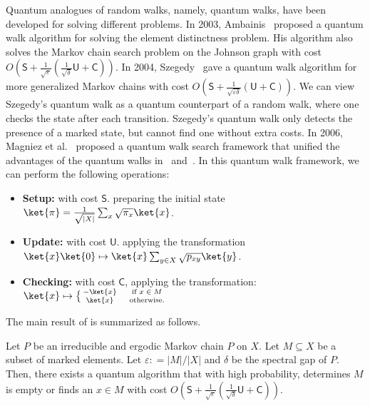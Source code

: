 Quantum analogues of random walks, namely, quantum walks, have been developed for solving different problems. In 2003, Ambainis~\cite{r5} proposed a quantum walk algorithm for solving the element distinctness problem. His algorithm also solves the Markov chain search problem on the Johnson graph with cost $O(\mathsf{S} + \frac{1}{\sqrt{\varepsilon}}(\frac{1}{\sqrt{\delta}}\mathsf{U} + \mathsf{C}))$. In 2004, Szegedy~\cite{r45} gave a quantum walk algorithm for more generalized Markov chains with cost $O(\mathsf{S} + \frac{1}{\sqrt{\varepsilon\delta}}(\mathsf{U} + \mathsf{C}))$. We can view Szegedy's quantum walk as a quantum counterpart of a random walk, where one checks the state after each transition. Szegedy's quantum walk only detects the presence of a marked state, but cannot find one without extra costs. In 2006, Magniez et al.~\cite{r33} proposed a quantum walk search framework that unified the advantages of the quantum walks in~\cite{r5} and~\cite{r45}. In this quantum walk framework, we can perform the following operations:
\begin{itemize}
  \item \textbf{Setup:} with cost $\mathsf{S}$. preparing the initial state $\ket{\pi} = \frac{1}{\sqrt{|X|}}\sum_{x}\sqrt{\pi_x}\ket{x}$.
  \item \textbf{Update:}  with cost $\mathsf{U}$. applying the transformation $\ket{x}\ket{0} \mapsto \ket{x}\sum_{y\in X}\sqrt{p_{xy}}\ket{y}$.
  \item \textbf{Checking:} with cost $\mathsf{C}$, applying the transformation: $\ket{x} \mapsto \big\{\begin{smallmatrix} -\ket{x} \quad &\text{if $x\in M$} \\ \ket{x} \quad &\text{otherwise.}\end{smallmatrix}$
\end{itemize}
The main result of \cite{r33} is summarized as follows.
\begin{lemma}[\cite{r33}]
  \label{lem:framework}
  Let $P$ be an irreducible and ergodic Markov chain $P$ on $X$. Let $M \subseteq X$ be a subset of marked elements. Let $\varepsilon: = |M|/|X|$ and $\delta$ be the spectral gap of $P$. Then, there exists a quantum algorithm that with high probability, determines $M$ is empty or finds an $x \in M$ with cost $O(\mathsf{S} + \frac{1}{\sqrt{\varepsilon}}(\frac{1}{\sqrt{\delta}}\mathsf{U} + \mathsf{C}))$.
\end{lemma}


